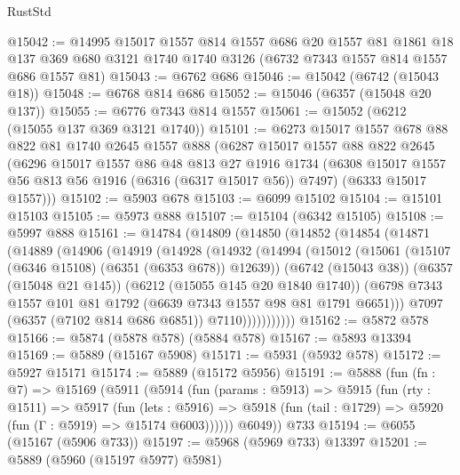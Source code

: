 \begin{lexlean}{RustStd}
\begin{coremodule}
@15042 := @14995
    @15017
    @1557
    @814
    @1557
    @686
    @20
    @1557
    @81
    @1861
    @18
    @137
    @369
    @680
    @3121
    @1740
    @1740
    @3126
    (@6732 @7343 @1557 @814 @1557 @686 @1557 @81)
@15043 := @6762 @686
@15046 := @15042 (@6742 (@15043 @18))
@15048 := @6768 @814 @686
@15052 := @15046 (@6357 (@15048 @20 @137))
@15055 := @6776 @7343 @814 @1557
@15061 := @15052 (@6212 (@15055 @137 @369 @3121 @1740))
@15101 := @6273
    @15017
    @1557
    @678
    @88
    @822
    @81
    @1740
    @2645
    @1557
    @888
    (@6287
      @15017
      @1557
      @88
      @822
      @2645
      (@6296
        @15017
        @1557
        @86
        @48
        @813
        @27
        @1916
        @1734
        (@6308 @15017 @1557 @56 @813 @56 @1916 (@6316 (@6317 @15017 @56)) @7497)
        (@6333 @15017 @1557)))
@15102 := @5903 @678
@15103 := @6099 @15102
@15104 := @15101 @15103
@15105 := @5973 @888
@15107 := @15104 (@6342 @15105)
@15108 := @5997 @888
@15161 := @14784
    (@14809
      (@14850
        (@14852
          (@14854
            (@14871
              (@14889
                (@14906
                  (@14919
                    (@14928
                      (@14932
                        (@14994
                          (@15012
                            (@15061 (@15107 (@6346 @15108) (@6351 (@6353 @678)) @12639))
                            (@6742 (@15043 @38))
                            (@6357 (@15048 @21 @145))
                            (@6212 (@15055 @145 @20 @1840 @1740))
                            (@6798
                              @7343
                              @1557
                              @101
                              @81
                              @1792
                              (@6639 @7343 @1557 @98 @81 @1791 @6651)))
                          @7097
                          (@6357 (@7102 @814 @686 @6851))
                          @7110)))))))))))
@15162 := @5872 @578
@15166 := @5874 (@5878 @578) (@5884 @578)
@15167 := @5893 @13394
@15169 := @5889 (@15167 @5908)
@15171 := @5931 (@5932 @578)
@15172 := @5927 @15171
@15174 := @5889 (@15172 @5956)
@15191 := @5888
    (fun (fn : @7) =>
    @15169
      (@5911
        (@5914
          (fun (params : @5913) =>
          @5915
            (fun (rty : @1511) =>
            @5917
              (fun (lets : @5916) =>
              @5918 (fun (tail : @1729) => @5920 (fun (Γ : @5919) => @15174 @6003))))))
        @6049))
    @733
@15194 := @6055 (@15167 (@5906 @733))
@15197 := @5968 (@5969 @733) @13397
@15201 := @5889 (@5960 (@15197 @5977) @5981)

\end{coremodule}
\end{lexlean}
